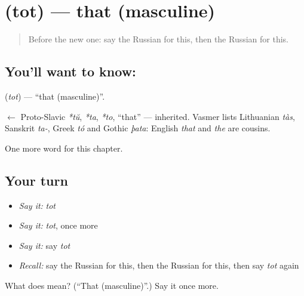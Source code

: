 \section[\texorpdfstring{\ru{тот} (tot)}{тот (tot)}]{ (tot) — that (masculine)}

\label{lesson:RU-C82-that}



\begin{quote}
Before the new one: say the Russian for this, then the Russian for this.
\end{quote}

\subsection*{You'll want to know: }
\textbf{} (\emph{tot}) — \textquotedblleft{}that (masculine)\textquotedblright{}.

\begin{cousinweb}
\textbf{} $\leftarrow$ Proto-Slavic \emph{*tŭ}, \emph{*ta}, \emph{*to}, \textquotedblleft{}that\textquotedblright{} — inherited. Vasmer lists Lithuanian \emph{tàs}, Sanskrit \emph{ta-}, Greek \emph{tó} and Gothic \emph{þata}: English \emph{that} and \emph{the} are cousins.
\end{cousinweb}

\begin{grammarlens}[title={What you've built}]
One more word for this chapter.
\end{grammarlens}

\subsection*{Your turn}
\begin{itemize}
\raggedright
  \item \emph{Say it:} \emph{tot}
  \item \emph{Say it:} \emph{tot}, once more
  \item \emph{Say it:} say \emph{tot}
  \item \emph{Recall:} say the Russian for this, then the Russian for this, then say \emph{tot} again
\end{itemize}

\begin{tcolorbox}[breakable,colback=teal!4,colframe=teal!35!black,title={Before you move on}]
What does  mean? (\textquotedblleft{}That (masculine)\textquotedblright{}.) Say it once more.
\end{tcolorbox}
